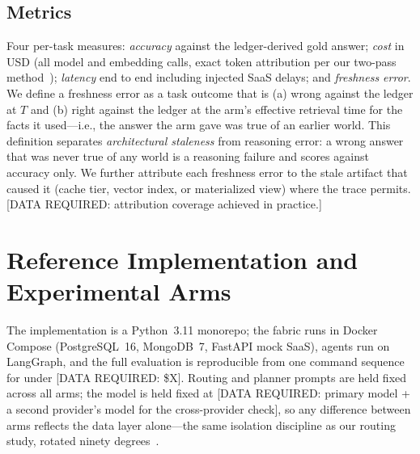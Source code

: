\documentclass{ieeeaccess}
\begin{document}
\subsection{Metrics}
\label{sec:metrics}
Four per-task measures: \emph{accuracy} against the ledger-derived gold answer;
\emph{cost} in USD (all model and embedding calls, exact token attribution per
our two-pass method~\cite{tca}); \emph{latency} end to end including injected
SaaS delays; and \emph{freshness error}. We define a freshness error as a task
outcome that is (a) wrong against the ledger at $T$ and (b) right against the
ledger at the arm's effective retrieval time for the facts it used---i.e., the
answer the arm gave was true of an earlier world. This definition separates
\emph{architectural staleness} from reasoning error: a wrong answer that was
never true of any world is a reasoning failure and scores against accuracy
only. We further attribute each freshness error to the stale artifact that
caused it (cache tier, vector index, or materialized view) where the trace
permits. [DATA REQUIRED: attribution coverage achieved in practice.]

\section{Reference Implementation and Experimental Arms}
\label{sec:impl}

The implementation is a Python~3.11 monorepo; the fabric runs in Docker Compose
(PostgreSQL~16, MongoDB~7, FastAPI mock SaaS), agents run on LangGraph, and the
full evaluation is reproducible from one command sequence for under
[DATA REQUIRED: \$X]. Routing and planner prompts are held fixed across all
arms; the model is held fixed at [DATA REQUIRED: primary model + a second
provider's model for the cross-provider check], so any difference between arms
reflects the data layer alone---the same isolation discipline as our routing
study, rotated ninety degrees~\cite{par}.
\end{document}
